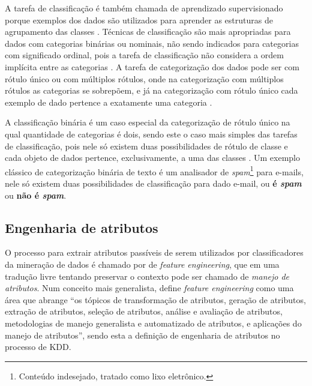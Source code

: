             A tarefa de classificação é também chamada de aprendizado supervisionado porque exemplos dos dados são utilizados para aprender as estruturas de agrupamento das classes \cite[p.~285]{Aggarwal_DMTT_2015}.
            Técnicas de classificação são mais apropriadas para dados com categorias binárias ou nominais, não sendo indicados para categorias com significado ordinal, pois a tarefa de classificação não considera a ordem implícita entre as categorias \cite[p.~147]{TanIDM2014}.
            A tarefa de categorização dos dados pode ser com rótulo único ou com múltiplos rótulos, onde na categorização com múltiplos rótulos as categorias se sobrepõem, e já na categorização com rótulo único cada exemplo de dado pertence a exatamente uma categoria \cite[p.~67]{Feldman:2006:TMH:1076381} \cite[p.~306]{TanIDM2014}.
            
            A classificação binária é um caso especial da categorização de rótulo único na qual quantidade de categorias é dois, sendo este o caso mais simples das tarefas de classificação, pois nele só existem duas possibilidades de rótulo de classe e cada objeto de dados pertence, exclusivamente, a uma das classes \cite[p.~67]{Feldman:2006:TMH:1076381} \cite[p.~81]{Jo2018TMCIBDC}.
            Um exemplo clássico de categorização binária de texto é um analisador de \textit{spam}\footnote{Conteúdo indesejado, tratado como lixo eletrônico.} para e-mails, nele só existem duas possibilidades de classificação para dado e-mail, ou \textbf{é \textit{spam}} ou \textbf{não é \textit{spam}}.
        
    \subsection{Engenharia de atributos} \label{subsec:Engenharia-de-atributos}
        O processo para extrair atributos passíveis de serem utilizados por classificadores da mineração de dados é chamado por  de \textit{feature engineering}, que em uma tradução livre tentando preservar o contexto pode ser chamado de \textit{manejo de atributos}.
        Num conceito mais generalista,  define \textit{feature engineering} como uma área que abrange ``os tópicos de transformação de atributos, geração de atributos, extração de atributos, seleção de atributos, análise e avaliação de atributos, metodologias de manejo generalista e automatizado de atributos, e aplicações do manejo de atributos'', sendo esta a definição de engenharia de atributos no processo de KDD.
        
